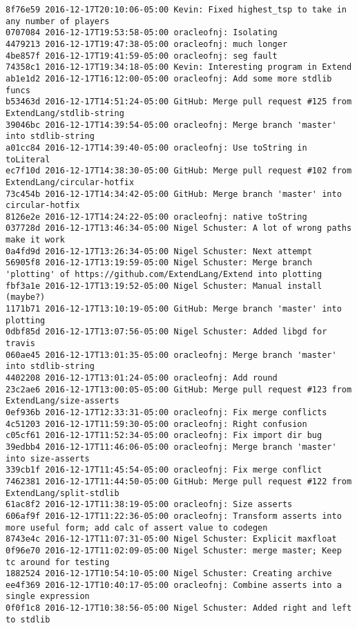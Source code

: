 \begin{lstlisting}
8f76e59 2016-12-17T20:10:06-05:00 Kevin: Fixed highest_tsp to take in any number of players
0707084 2016-12-17T19:53:58-05:00 oracleofnj: Isolating
4479213 2016-12-17T19:47:38-05:00 oracleofnj: much longer
4be857f 2016-12-17T19:41:59-05:00 oracleofnj: seg fault
74358c1 2016-12-17T19:34:18-05:00 Kevin: Interesting program in Extend
ab1e1d2 2016-12-17T16:12:00-05:00 oracleofnj: Add some more stdlib funcs
b53463d 2016-12-17T14:51:24-05:00 GitHub: Merge pull request #125 from ExtendLang/stdlib-string
39046bc 2016-12-17T14:39:54-05:00 oracleofnj: Merge branch 'master' into stdlib-string
a01cc84 2016-12-17T14:39:40-05:00 oracleofnj: Use toString in toLiteral
ec7f10d 2016-12-17T14:38:30-05:00 GitHub: Merge pull request #102 from ExtendLang/circular-hotfix
73c454b 2016-12-17T14:34:42-05:00 GitHub: Merge branch 'master' into circular-hotfix
8126e2e 2016-12-17T14:24:22-05:00 oracleofnj: native toString
037728d 2016-12-17T13:46:34-05:00 Nigel Schuster: A lot of wrong paths make it work
0a4fd9d 2016-12-17T13:26:34-05:00 Nigel Schuster: Next attempt
56905f8 2016-12-17T13:19:59-05:00 Nigel Schuster: Merge branch 'plotting' of https://github.com/ExtendLang/Extend into plotting
fbf3a1e 2016-12-17T13:19:52-05:00 Nigel Schuster: Manual install (maybe?)
1171b71 2016-12-17T13:10:19-05:00 GitHub: Merge branch 'master' into plotting
0dbf85d 2016-12-17T13:07:56-05:00 Nigel Schuster: Added libgd for travis
060ae45 2016-12-17T13:01:35-05:00 oracleofnj: Merge branch 'master' into stdlib-string
4402208 2016-12-17T13:01:24-05:00 oracleofnj: Add round
23c2ae6 2016-12-17T13:00:05-05:00 GitHub: Merge pull request #123 from ExtendLang/size-asserts
0ef936b 2016-12-17T12:33:31-05:00 oracleofnj: Fix merge conflicts
4c51203 2016-12-17T11:59:30-05:00 oracleofnj: Right confusion
c05cf61 2016-12-17T11:52:34-05:00 oracleofnj: Fix import dir bug
39edbb4 2016-12-17T11:46:06-05:00 oracleofnj: Merge branch 'master' into size-asserts
339cb1f 2016-12-17T11:45:54-05:00 oracleofnj: Fix merge conflict
7462381 2016-12-17T11:44:50-05:00 GitHub: Merge pull request #122 from ExtendLang/split-stdlib
61ac8f2 2016-12-17T11:38:19-05:00 oracleofnj: Size asserts
606af9f 2016-12-17T11:22:36-05:00 oracleofnj: Transform asserts into more useful form; add calc of assert value to codegen
8743e4c 2016-12-17T11:07:31-05:00 Nigel Schuster: Explicit maxfloat
0f96e70 2016-12-17T11:02:09-05:00 Nigel Schuster: merge master; Keep tc around for testing
1882524 2016-12-17T10:54:10-05:00 Nigel Schuster: Creating archive
ee4f369 2016-12-17T10:40:17-05:00 oracleofnj: Combine asserts into a single expression
0f0f1c8 2016-12-17T10:38:56-05:00 Nigel Schuster: Added right and left to stdlib

\end{lstlisting}
